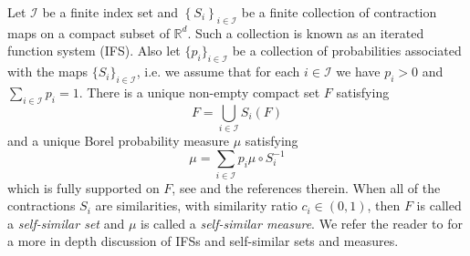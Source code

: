 \documentclass[12pt]{amsart}
\numberwithin{equation}{section}
\begin{document}
Let  $\mathcal{I}$ be a finite index set and $\left\{S_i \right\}_{i \in \mathcal{I}}$ be a finite collection of  contraction maps on a compact subset of $\mathbb{R}^d$.  Such a collection is known as an iterated function system (IFS).  Also let $\{p_i\}_{i \in \mathcal{I}}$ be a collection of probabilities associated with the maps $\{S_i\}_{i \in \mathcal{I}}$, i.e. we assume that for each $i \in \mathcal{I}$ we have $p_i>0$ and $\sum_{i \in \mathcal{I}} p_i = 1$. There is a  unique non-empty compact set $F$ satisfying 
\[
F=\displaystyle\bigcup_{i\in \mathcal{I}} S_i(F)
\]
and  a unique Borel probability measure $\mu$ satisfying
\[
\mu = \sum_{i \in \mathcal{I}} p_i \mu \circ S_i^{-1}
\]
which is fully supported on $F$, see \cite[Chapter 9]{falconer} and the references therein.  When all of the contractions $S_i$ are similarities, with similarity ratio $c_i \in \left(0,1 \right)$, then $F$ is called a \emph{self-similar set} and $\mu$ is called a \emph{self-similar measure}.  We refer the reader to \cite{falconer} for a more in depth discussion of IFSs and self-similar sets and measures.
\end{document}
